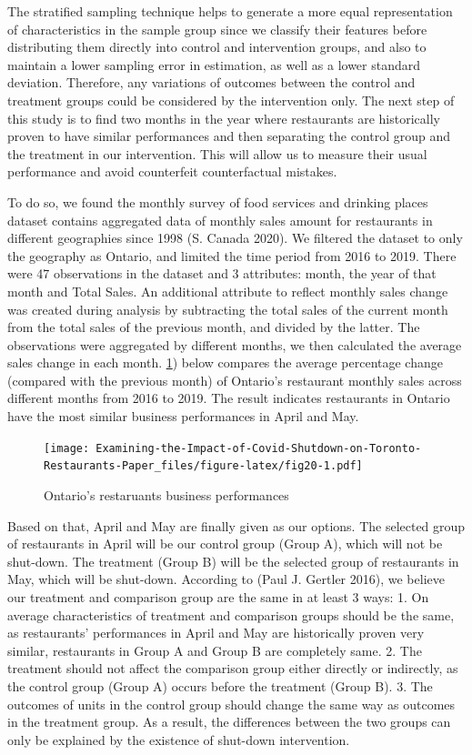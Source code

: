 \documentclass[
]{article}
\begin{document}
The stratified sampling technique helps to generate a more equal representation of characteristics in the sample group since we classify their features before distributing them directly into control and intervention groups, and also to maintain a lower sampling error in estimation, as well as a lower standard deviation. Therefore, any variations of outcomes between the control and treatment groups could be considered by the intervention only.
The next step of this study is to find two months in the year where restaurants are historically proven to have similar performances and then separating the control group and the treatment in our intervention. This will allow us to measure their usual performance and avoid counterfeit counterfactual mistakes.

To do so, we found the monthly survey of food services and drinking places dataset contains aggregated data of monthly sales amount for restaurants in different geographies since 1998 (S. Canada 2020). We filtered the dataset to only the geography as Ontario, and limited the time period from 2016 to 2019. There were 47 observations in the dataset and 3 attributes: month, the year of that month and Total Sales. An additional attribute to reflect monthly sales change was created during analysis by subtracting the total sales of the current month from the total sales of the previous month, and divided by the latter. The observations were aggregated by different months, we then calculated the average sales change in each month. \ref{fig:fig20}) below compares the average percentage change (compared with the previous month) of Ontario's restaurant monthly sales across different months from 2016 to 2019. The result indicates restaurants in Ontario have the most similar business performances in April and May.

\begin{figure}
\centering
\texttt{[image: Examining-the-Impact-of-Covid-Shutdown-on-Toronto-Restaurants-Paper\_files/figure-latex/fig20-1.pdf]}
\caption{\label{fig:fig20}Ontario's restaruants business performances}
\end{figure}

Based on that, April and May are finally given as our options. The selected group of restaurants in April will be our control group (Group A), which will not be shut-down. The treatment (Group B) will be the selected group of restaurants in May, which will be shut-down. According to (Paul J. Gertler 2016), we believe our treatment and comparison group are the same in at least 3 ways: 1. On average characteristics of treatment and comparison groups should be the same, as restaurants' performances in April and May are historically proven very similar, restaurants in Group A and Group B are completely same. 2. The treatment should not affect the comparison group either directly or indirectly, as the control group (Group A) occurs before the treatment (Group B). 3. The outcomes of units in the control group should change the same way as outcomes in the treatment group. As a result, the differences between the two groups can only be explained by the existence of shut-down intervention.
\end{document}
